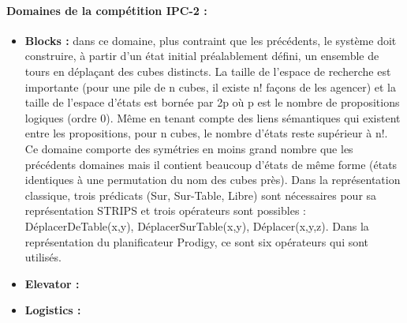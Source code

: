 \paragraph*{Domaines de la compétition IPC-2 :}
\begin{itemize}
\item \textbf{Blocks :} dans ce domaine, plus contraint que les précédents, le système doit construire, à partir d'un état initial préalablement défini, un ensemble de tours en déplaçant des cubes distincts. La taille de l'espace de recherche est importante (pour une pile de n cubes, il existe n! façons de les agencer) et la taille de l'espace d'états est bornée par 2p où p est le nombre de propositions logiques (ordre 0). Même en tenant compte des liens sémantiques qui existent entre les propositions, pour n cubes, le nombre d'états reste supérieur à n!. Ce domaine comporte des symétries en moins grand nombre que les précédents domaines mais il contient beaucoup d'états de même forme (états identiques à une permutation du nom des cubes près). Dans la représentation classique, trois prédicats (Sur, Sur-Table, Libre) sont nécessaires pour sa représentation STRIPS et trois opérateurs sont possibles : DéplacerDeTable(x,y), DéplacerSurTable(x,y), Déplacer(x,y,z). Dans la représentation du planificateur Prodigy, ce sont six opérateurs qui sont utilisés.
\item \textbf{Elevator :}
\item \textbf{Logistics :}
\end{itemize}

